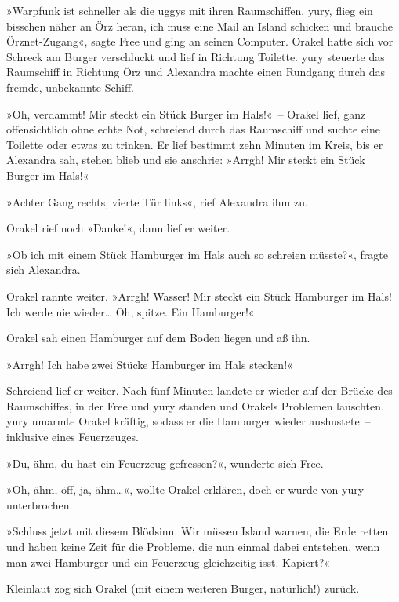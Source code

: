 »Warpfunk ist schneller als die uggys mit ihren Raumschiffen. yury, flieg ein bisschen näher an Örz heran, ich muss eine Mail an Island schicken und brauche Örznet-Zugang«, sagte Free und ging an seinen Computer. Orakel hatte sich vor Schreck am Burger verschluckt und lief in Richtung Toilette. yury steuerte das Raumschiff in Richtung Örz und Alexandra machte einen Rundgang durch das fremde, unbekannte Schiff.

»Oh, verdammt! Mir steckt ein Stück Burger im Hals!«~– Orakel lief, ganz offensichtlich ohne echte Not, schreiend durch das Raumschiff und suchte eine Toilette oder etwas zu trinken. Er lief bestimmt zehn Minuten im Kreis, bis er Alexandra sah, stehen blieb und sie anschrie: »Arrgh! Mir steckt ein Stück Burger im Hals!«

»Achter Gang rechts, vierte Tür links«, rief Alexandra ihm zu.

Orakel rief noch »Danke!«, dann lief er weiter.

»Ob ich mit einem Stück Hamburger im Hals auch so schreien müsste?«, fragte sich Alexandra.

Orakel rannte weiter. »Arrgh! Wasser! Mir steckt ein Stück Hamburger im Hals! Ich werde nie wieder… Oh, spitze. Ein Hamburger!«

Orakel sah einen Hamburger auf dem Boden liegen und aß ihn.

»Arrgh! Ich habe zwei Stücke Hamburger im Hals stecken!«

Schreiend lief er weiter. Nach fünf Minuten landete er wieder auf der Brücke des Raumschiffes, in der Free und yury standen und Orakels Problemen lauschten. yury umarmte Orakel kräftig, sodass er die Hamburger wieder aushustete~– inklusive eines Feuerzeuges.

»Du, ähm, du hast ein Feuerzeug gefressen?«, wunderte sich Free.

»Oh, ähm, öff, ja, ähm…«, wollte Orakel erklären, doch er wurde von yury unterbrochen.

»Schluss jetzt mit diesem Blödsinn. Wir müssen Island warnen, die Erde retten und haben keine Zeit für die Probleme, die nun einmal dabei entstehen, wenn man zwei Hamburger und ein Feuerzeug gleichzeitig isst. Kapiert?«

Kleinlaut zog sich Orakel (mit einem weiteren Burger, natürlich!) zurück.

